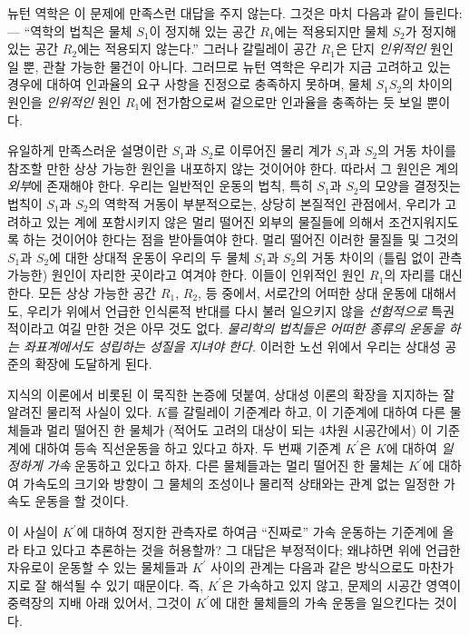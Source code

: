 뉴턴 역학은 이 문제에 만족스런 대답을 주지 않는다. 그것은 마치 다음과 같이 들린다: --- ``역학의 법칙은 물체 $S_1$이 정지해 있는 공간 $R_1$에는 적용되지만 물체 $S_2$가 정지해 있는 공간 $R_2$에는 적용되지 않는다.'' 그러나 갈릴레이 공간 $R_1$은 단지 \emph{인위적인} 원인일 뿐, 관찰 가능한 물건이 아니다. 그러므로 뉴턴 역학은 우리가 지금 고려하고 있는 경우에 대하여 인과율의 요구 사항을 진정으로 충족하지 못하며, 물체 $S_1$\과 $S_2$의 차이의 원인을 \emph{인위적인} 원인 $R_1$에 전가함으로써 겉으로만 인과율을 충족하는 듯 보일 뿐이다.

유일하게 만족스러운 설명이란 $S_1$과 $S_2$로 이루어진 물리 계가 $S_1$과 $S_2$의 거동 차이를 참조할 만한 상상 가능한 원인을 내포하지 않는 것이어야 한다. 따라서 그 원인은 계의 \emph{외부}에 존재해야 한다. 우리는 일반적인 운동의 법칙, 특히 $S_1$과 $S_2$의 모양을 결정짓는 법칙이 $S_1$과 $S_2$의 역학적 거동이 부분적으로는, 상당히 본질적인 관점에서, 우리가 고려하고 있는 계에 포함시키지 않은 멀리 떨어진 외부의 물질들에 의해서 조건지워지도록 하는 것이어야 한다는 점을 받아들여야 한다. 멀리 떨어진 이러한 물질들 및 그것의 $S_1$과 $S_2$에 대한 상대적 운동이 우리의 두 물체 $S_1$과 $S_2$의 거동 차이의 (틀림 없이 관측 가능한) 원인이 자리한 곳이라고 여겨야 한다. 이들이 인위적인 원인 $R_1$의 자리를 대신한다. 모든 상상 가능한 공간 $R_1$, $R_2$, 등 중에서, 서로간의 어떠한 상대 운동에 대해서도, 우리가 위에서 언급한 인식론적 반대를 다시 불러 일으키지 않을 \emph{선험적으로} 특권적이라고 여길 만한 것은 아무 것도 없다. \emph{물리학의 법칙들은 어떠한 종류의 운동을 하는 좌표계에서도 성립하는 성질을 지녀야 한다.} 이러한 노선 위에서 우리는 상대성 공준의 확장에 도달하게 된다.

지식의 이론에서 비롯된 이 묵직한 논증에 덧붙여, 상대성 이론의 확장을 지지하는 잘 알려진 물리적 사실이 있다. $K$를 갈릴레이 기준계라 하고, 이 기준계에 대하여 다른 물체들과 멀리 떨어진 한 물체가 (적어도 고려의 대상이 되는 4차원 시공간에서) 이 기준계에 대하여 등속 직선운동을 하고 있다고 하자. 두 번째 기준계 $K^{\prime}$은 $K$에 대하여 \emph{일정하게 가속} 운동하고 있다고 하자.
다른 물체들과는 멀리 떨어진 한 물체는 $K^{\prime}$에 대하여 가속도의 크기와 방향이 그 물체의 조성이나 물리적 상태와는 관계 없는 일정한 가속도 운동을 할 것이다.

이 사실이 $K^{\prime}$에 대하여 정지한 관측자로 하여금 ``진짜로'' 가속 운동하는 기준계에 올라 타고 있다고 추론하는 것을 허용할까? 그 대답은 부정적이다; 왜냐하면 위에 언급한 자유로이 운동할 수 있는 물체들과 $K^{\prime}$ 사이의 관계는 다음과 같은 방식으로도 마찬가지로 잘 해석될 수 있기 때문이다. 즉, $K^{\prime}$은 가속하고 있지 않고, 문제의 시공간 영역이 중력장의 지배 아래 있어서, 그것이 $K^{\prime}$에 대한 물체들의 가속 운동을 일으킨다는 것이다.

